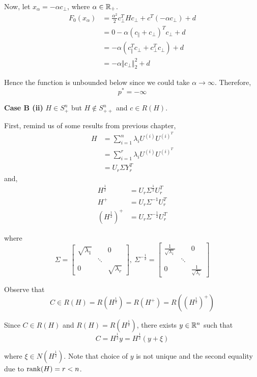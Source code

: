 Now, let $x_{\alpha} =-\alpha c_{\perp}$, where $\alpha \in \mathbb{R}_+$.
\begin{align*}
F_0(x_{\alpha}) 
&=\frac{{\alpha}^2}{2}c_{\perp}^THc_{\perp} + c^T(-\alpha c_{\perp}) + d\\
&= 0 - \alpha(c_{\Vert} + c_{\perp})^Tc_{\perp} + d\\
&= -\alpha(c_{\Vert}^Tc_{\perp} + c_{\perp}^Tc_{\perp}) + d\\
&= -\alpha \Vert c_{\perp}\Vert^2_2 + d
\end{align*}

Hence the function is unbounded below since we could take $\alpha \to\infty$. Therefore,
$$p^*=-\infty$$



\vspace{0.3cm}
\textbf{Case B (ii)}  $H\in S_+^n$ but $H\notin S^n_{++}$ and $c \in R(H)$.

First, remind us of some results from previous chapter,
\begin{align*}
H 
&= \sum^n_{i=1}\lambda_i U^{(i)}U^{(i)^T} \\
&= \sum^r_{i=1}\lambda_i U^{(i)}U^{(i)^T}\\
&= U_r\Sigma Y_r^T
\end{align*}
and,
\begin{align*}
H^{\frac{1}{2}} &= U_r\Sigma^{\frac{1}{2}}U_r^T\\
H^{+} &= U_r\Sigma^{-1}U_r^T\\
(H^{\frac{1}{2}})^+ &= U_r\Sigma^{-\frac{1}{2}}U_r^T
\end{align*}

where 
$$\Sigma = 
\begin{bmatrix}
\sqrt{\lambda_1} &  & 0 \\
&\ddots&\\
0&&\sqrt{\lambda_r}
\end{bmatrix}
,\
\Sigma^{-\frac{1}{2}} =
\begin{bmatrix}
\frac{1}{\sqrt{\lambda_1}} &  & 0 \\
&\ddots&\\
0&&\frac{1}{\sqrt{\lambda_r}}
\end{bmatrix}
$$

Observe that
$$C\in R(H) = R(H^{\frac{1}{2}}) = R(H^+) = R\left((H^{\frac{1}{2}})^+\right)$$

Since $C\in R(H)$ and $R(H) = R(H^{\frac{1}{2}})$, there exists $y \in \mathbb{R}^n$ such that
$$C = H^{\frac{1}{2}}y = H^{\frac{1}{2}}(y+\xi)$$

where $\xi \in N(H^{\frac{1}{2}})$. Note that choice of $y$ is not unique and the second equality due to $\operatorname{rank}(H)= r<n$. 

